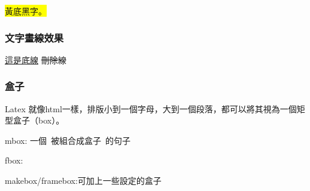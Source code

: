 \hbox{\colorbox{yellow}{黃底黑字。}}
\hbox{\color{blue}{藍色文字}}
\hbox{}
\hbox{\color{black}{最後請記得回復成預設黑色字體}}

\subsubsection{文字畫線效果}

\hbox{\uline{這是底線}}
\hbox{}
\hbox{}
\hbox{\sout{刪除線}}
\hbox{}

\subsubsection{盒子}
Latex 就像html一樣，排版小到一個字母，大到一個段落，都可以將其視為一個矩型盒子（box）。

mbox:
\mbox{一個 被組合成盒子 的句子}

fbox:

makebox/framebox:可加上一些設定的盒子

\hbox{}



\newpage
